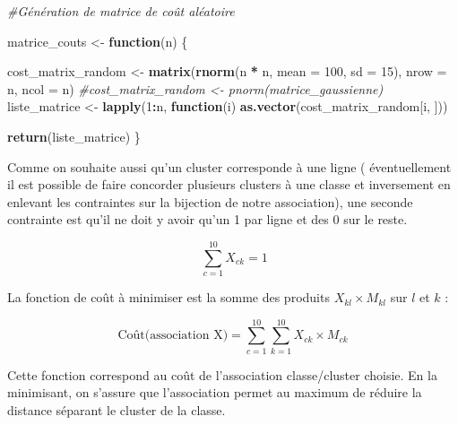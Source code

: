 \documentclass[
  ignorenonframetext,
]{beamer}
\newenvironment{Shaded}{\begin{snugshade}}{\end{snugshade}}
\newcommand{\AttributeTok}[1]{\textcolor[rgb]{0.13,0.29,0.53}{#1}}
\newcommand{\CommentTok}[1]{\textcolor[rgb]{0.56,0.35,0.01}{\textit{#1}}}
\newcommand{\ControlFlowTok}[1]{\textcolor[rgb]{0.13,0.29,0.53}{\textbf{#1}}}
\newcommand{\DecValTok}[1]{\textcolor[rgb]{0.00,0.00,0.81}{#1}}
\newcommand{\FunctionTok}[1]{\textcolor[rgb]{0.13,0.29,0.53}{\textbf{#1}}}
\newcommand{\NormalTok}[1]{#1}
\newcommand{\OtherTok}[1]{\textcolor[rgb]{0.56,0.35,0.01}{#1}}
\newcommand{\SpecialCharTok}[1]{\textcolor[rgb]{0.81,0.36,0.00}{\textbf{#1}}}
\begin{document}
\begin{frame}[fragile]{}
\protect\hypertarget{section-7}{}
\begin{Shaded}
\begin{Highlighting}[]
\CommentTok{\#Génération de matrice de coût aléatoire}

\NormalTok{matrice\_couts }\OtherTok{\textless{}{-}} \ControlFlowTok{function}\NormalTok{(n) \{}
  
\NormalTok{  cost\_matrix\_random }\OtherTok{\textless{}{-}} \FunctionTok{matrix}\NormalTok{(}\FunctionTok{rnorm}\NormalTok{(n }\SpecialCharTok{*}\NormalTok{ n, }\AttributeTok{mean =} \DecValTok{100}\NormalTok{, }\AttributeTok{sd =} \DecValTok{15}\NormalTok{), }\AttributeTok{nrow =}\NormalTok{ n, }\AttributeTok{ncol =}\NormalTok{ n)}
  \CommentTok{\#cost\_matrix\_random \textless{}{-} pnorm(matrice\_gaussienne)}
\NormalTok{  liste\_matrice }\OtherTok{\textless{}{-}} \FunctionTok{lapply}\NormalTok{(}\DecValTok{1}\SpecialCharTok{:}\NormalTok{n, }\ControlFlowTok{function}\NormalTok{(i) }\FunctionTok{as.vector}\NormalTok{(cost\_matrix\_random[i, ]))}
  
  \FunctionTok{return}\NormalTok{(liste\_matrice)}
\NormalTok{\}}
\end{Highlighting}
\end{Shaded}
\end{frame}

\begin{frame}{}
\protect\hypertarget{section-8}{}
Comme on souhaite aussi qu'un cluster corresponde à une ligne (
éventuellement il est possible de faire concorder plusieurs clusters à
une classe et inversement en enlevant les contraintes sur la bijection
de notre association), une seconde contrainte est qu'il ne doit y avoir
qu'un 1 par ligne et des 0 sur le reste.

\[
\ \sum_{c=1}^{10} X_{ck} = 1
\]

La fonction de coût à minimiser est la somme des produits
\(X_{kl} \times M_{kl}\) sur \(l\) et \(k\) :

\[
\text{Coût(association X)} = \sum_{c=1}^{10} \sum_{k=1}^{10} X_{ck} \times M_{ck}
\]

Cette fonction correspond au coût de l'association classe/cluster
choisie. En la minimisant, on s'assure que l'association permet au
maximum de réduire la distance séparant le cluster de la classe.
\end{frame}
\end{document}
